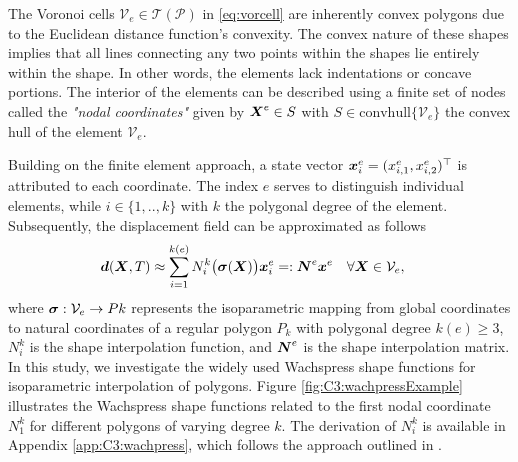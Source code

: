 %
The Voronoi cells $\mathcal{V}_e \in \mathcal{T}(\mathcal{P})$ in \eqref{eq:vorcell} are inherently convex polygons due to the Euclidean distance function's convexity. The convex nature of these shapes implies that all lines connecting any two points within the shapes lie entirely within the shape. In other words, the elements lack indentations or concave portions. The interior of the elements can be described using a finite set of nodes called the \textit{"nodal coordinates"} given by ${\boldsymbol{X}}^e \in S$ with $S \in \textrm{convhull}\{\mathcal{V}_e\}$ the convex hull of the element $\mathcal{V}_e$.

Building on the finite element approach, a state vector ${\boldsymbol{x}}^e_i = (x^e_{i,1}, x^e_{i,2})^\top$ is attributed to each coordinate. The index $e$ serves to distinguish individual elements, while $i \in \{1,..,k\}$ with $k$ the polygonal degree of the element. Subsequently, the displacement field can be approximated as follows
%
\begin{align}
\dB(\XB,T) &\approx \sum^{k(e)}_{i=1} N_i^{k}\big(\sigmaB(\XB)\big) \xB^{e}_i  =: \NB^{e} \xB^{e} \quad \forall \XB \in \mathcal{V}_e,%
\end{align}
%
where $\boldsymbol{\sigma}: \mathcal{V}_e \to P{k}$ represents the isoparametric mapping from global coordinates to natural coordinates of a regular polygon $P_{k}$ with polygonal degree $k(e) \ge 3$, $N^k_i$ is the shape interpolation function, and ${\boldsymbol{N}}^{e}$ is the shape interpolation matrix. In this study, we investigate the widely used Wachspress shape functions \cite{Sukumar2004Nov, Talischi2012, Talischi2012Mar, Floater2014Jun} for isoparametric interpolation of polygons. Figure \ref{fig:C3:wachpressExample} illustrates the Wachspress shape functions related to the first nodal coordinate $N^k_1$ for different polygons of varying degree $k$. The derivation of $N^k_i$ is available in Appendix \ref{app:C3:wachpress}, which follows the approach outlined in \cite{Talischi2012Mar, Floater2014Jun}.

